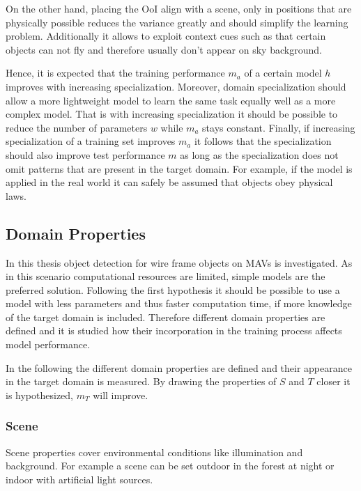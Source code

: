 On the other hand, placing the \ac{OoI} align with a scene, only in positions that are physically possible reduces the variance greatly and should simplify the learning problem. Additionally it allows to exploit context cues such as that certain objects can not fly and therefore usually don't appear on sky background. 

Hence, it is expected that the training performance $m_{a}$ of a certain model $h$ improves with increasing specialization. Moreover, domain specialization should allow a more lightweight model to learn the same task equally well as a more complex model. That is with increasing specialization it should be possible to reduce the number of parameters $w$ while $m_{a}$ stays constant. Finally, if increasing specialization of a training set improves $m_{a}$ it follows that the specialization should also improve test performance $m$ as long as the specialization does not omit patterns that are present in the target domain. For example, if the model is applied in the real world it can safely be assumed that objects obey physical laws.

\subsection{Domain Properties}

In this thesis object detection for wire frame objects on \acp{MAV} is investigated. As in this scenario computational resources are limited, simple models are the preferred solution. Following the first hypothesis it should be possible to use a model with less parameters and thus faster computation time, if more knowledge of the target domain is included. Therefore different domain properties are defined and it is studied how their incorporation in the training process affects model performance.   

In the following the different domain properties are defined and their appearance in the target domain is measured. By drawing the properties of $S$ and $T$ closer it is hypothesized, $m_T$ will improve.

\subsubsection{Scene}

Scene properties cover environmental conditions like illumination and background. For example a scene can be set outdoor in the forest at night or indoor with artificial light sources.

